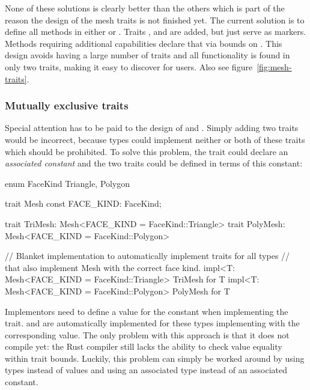 None of these solutions is clearly better than the others which is part of the reason the design of the mesh traits is not finished yet.
The current solution is to define all methods in either  or .
Traits ,  and  are added, but just serve as markers.
Methods requiring additional capabilities declare that via bounds on .
This design avoids having a large number of traits and all functionality is found in only two traits, making it easy to discover for users.
Also see figure~\ref{fig:mesh-traits}.

\subsubsection*{Mutually exclusive traits}

Special attention has to be paid to the design of  and .
Simply adding two traits would be incorrect, because types could implement neither or both of these traits which should be prohibited.
To solve this problem, the trait  could declare an \emph{associated constant} and the two traits could be defined in terms of this constant:

\begin{rustcode}
  enum FaceKind { Triangle, Polygon }

  trait Mesh {
      const FACE_KIND: FaceKind;
  }

  trait TriMesh: Mesh<FACE_KIND = FaceKind::Triangle> {}
  trait PolyMesh: Mesh<FACE_KIND = FaceKind::Polygon> {}

  // Blanket implementation to automatically implement traits for all types
  // that also implement Mesh with the correct face kind.
  impl<T: Mesh<FACE_KIND = FaceKind::Triangle> TriMesh for T {}
  impl<T: Mesh<FACE_KIND = FaceKind::Polygon> PolyMesh for T {}
\end{rustcode}

Implementors need to define a value for the constant when implementing the trait.
 and  are automatically implemented for these types implementing  with the corresponding value.
The only problem with this approach is that it does not compile yet:
the Rust compiler still lacks the ability to check value equality within trait bounds.
Luckily, this problem can simply be worked around by using types instead of values and using an associated type instead of an associated constant.


